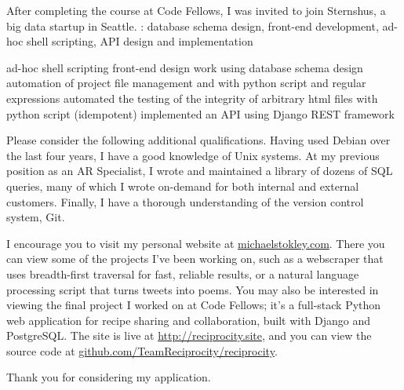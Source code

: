 \documentclass[10pt,a4paper,sans]{moderncv}        %
\begin{document}
After completing the course at Code Fellows, I was invited to join Sternshus, a
big data startup in Seattle. : database
schema design, front-end development, ad-hoc shell scripting, API design and
implementation

ad-hoc shell scripting
front-end design work using
database schema design
automation of project file management and with python script and regular expressions
automated the testing of the integrity of arbitrary html files with python
script (idempotent)
implemented an API using Django REST framework


Please consider the following additional qualifications. Having used Debian over
the last four years, I have a good knowledge of Unix systems. At my previous
position as an AR Specialist, I wrote and maintained a library of dozens of SQL
queries, many of which I wrote on-demand for both internal and external
customers. Finally, I have a thorough understanding of the version control
system, Git.

I encourage you to visit my personal
website at {\href{http://michaelstokley.com}{michaelstokley.com}}. There
you can view some of the projects I've been working on, such as a webscraper
that uses breadth-first traversal for fast, reliable results, or a natural
language processing script that turns tweets into poems. You may also be
interested in viewing the final project I worked on at Code Fellows; it's a
full-stack Python web application for recipe sharing and collaboration, built
with Django and PostgreSQL. The site is live at
{\href{http://reciprocity.site.}{http://reciprocity.site}}, and you can view the
source code at {\href{http://github.com/TeamReciprocity/reciprocity}{github.com/TeamReciprocity/reciprocity}}.

Thank you for considering my application. 

\makeletterclosing

\end{document}
